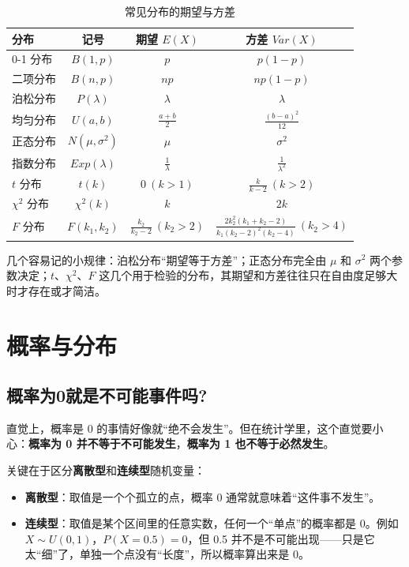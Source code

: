 \documentclass[lang=cn,10pt]{elegantbook}
\begin{document}
\begin{table}[H]
  \centering
  \caption{常见分布的期望与方差}
  \begin{tabular}{lccc}
    \toprule
    分布 & 记号 & 期望 $E(X)$ & 方差 $Var(X)$ \\
    \midrule
    0-1 分布 & $B(1,p)$ & $p$ & $p(1-p)$ \\
    二项分布 & $B(n,p)$ & $np$ & $np(1-p)$ \\
    泊松分布 & $P(\lambda)$ & $\lambda$ & $\lambda$ \\
    均匀分布 & $U(a,b)$ & $\frac{a+b}{2}$ & $\frac{(b-a)^2}{12}$ \\
    正态分布 & $N(\mu,\sigma^2)$ & $\mu$ & $\sigma^2$ \\
    指数分布 & $Exp(\lambda)$ & $\frac{1}{\lambda}$ & $\frac{1}{\lambda^2}$ \\
    $t$ 分布 & $t(k)$ & $0\ (k>1)$ & $\frac{k}{k-2}\ (k>2)$ \\
    $\chi^2$ 分布 & $\chi^2(k)$ & $k$ & $2k$ \\
    $F$ 分布 & $F(k_1,k_2)$ & $\frac{k_2}{k_2-2}\ (k_2>2)$ & $\frac{2k_2^2(k_1+k_2-2)}{k_1(k_2-2)^2(k_2-4)}\ (k_2>4)$ \\
    \bottomrule
  \end{tabular}
\end{table}

\begin{remark}
几个容易记的小规律：泊松分布“期望等于方差”；正态分布完全由 $\mu$ 和 $\sigma^2$ 两个参数决定；$t$、$\chi^2$、$F$ 这几个用于检验的分布，其期望和方差往往只在自由度足够大时才存在或才简洁。
\end{remark}






\chapter{概率与分布}
\section{概率为0就是不可能事件吗?}
直觉上，概率是 0 的事情好像就“绝不会发生”。但在统计学里，这个直觉要小心：\textbf{概率为 0 并不等于不可能发生}，\textbf{概率为 1 也不等于必然发生}。

关键在于区分\textbf{离散型}和\textbf{连续型}随机变量：
\begin{itemize}
  \item \textbf{离散型}：取值是一个个孤立的点，概率 0 通常就意味着“这件事不发生”。
  \item \textbf{连续型}：取值是某个区间里的任意实数，任何一个“单点”的概率都是 0。例如 $X\sim U(0,1)$，$P(X=0.5)=0$，但 0.5 并不是不可能出现——只是它太“细”了，单独一个点没有“长度”，所以概率算出来是 0。
\end{itemize}
\end{document}
